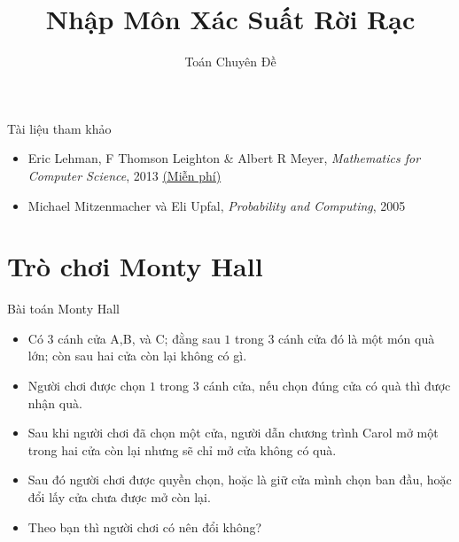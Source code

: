 %


\title{Nhập Môn Xác Suất Rời Rạc} 
 \author{Toán Chuyên Đề}   
 
\maketitle

\begin{frame}{Tài liệu tham khảo}
  \begin{itemize}
  \item Eric Lehman, F Thomson Leighton \& Albert R Meyer,
    \textit{Mathematics for Computer Science}, 2013
    \href{https://www.seas.harvard.edu/courses/cs20/MIT6_042Notes.pdf}{\color{blue}(Miễn
    phí)}
  \item Michael Mitzenmacher và Eli Upfal, \textit{Probability and Computing}, 2005
  \end{itemize}
\end{frame}

\section{Trò chơi Monty Hall}
\begin{frame}{Bài toán Monty Hall}
  \begin{itemize}
  \item Có $3$ cánh cửa A,B, và C; đằng sau $1$ trong $3$ cánh cửa đó là một món quà lớn; còn sau hai cửa còn lại không có gì.
  \item Người chơi được chọn $1$ trong $3$ cánh cửa, nếu chọn đúng cửa có quà thì được nhận quà.
  \item Sau khi người chơi đã chọn một cửa, người dẫn chương trình Carol  mở một trong hai cửa còn lại nhưng sẽ chỉ mở cửa không có quà.
  \item Sau đó người chơi được quyền chọn, hoặc là giữ cửa mình chọn ban đầu, hoặc đổi lấy cửa chưa được mở còn lại.
  \item Theo bạn thì người chơi có nên đổi không?
  \end{itemize}
\end{frame}


